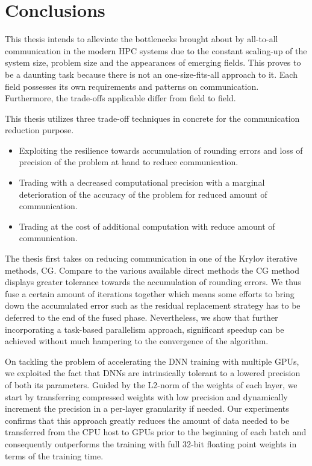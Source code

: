 \chapter{Conclusions}
\label{chap:conclusions}
This thesis intends to alleviate the bottlenecks brought about by all-to-all 
communication in the modern HPC systems due to the constant scaling-up of the 
system size, problem size and the appearances of emerging fields.
This proves to be a daunting task because there is not an one-size-fits-all 
approach to it. Each field possesses its own requirements and patterns on 
communication. Furthermore, the trade-offs applicable differ from field to 
field.

This thesis utilizes three trade-off techniques in concrete for the communication 
reduction purpose.
\begin{itemize}
    \item Exploiting the resilience towards accumulation of rounding errors and 
        loss of precision of the problem at hand to reduce communication.
    \item Trading with a decreased computational precision with a marginal 
        deterioration of the accuracy of the problem for reduced amount of 
        communication. 
    \item Trading at the cost of additional computation with reduce amount of 
        communication.
\end{itemize}

The thesis first takes on reducing communication in one of the Krylov iterative 
methods, CG. Compare to the various available direct methods the CG method 
displays greater tolerance towards the accumulation of rounding errors. We thus 
fuse a certain amount of iterations together which means some efforts to bring 
down the accumulated error such as the residual replacement strategy has to be 
deferred to the end of the fused phase. Nevertheless, we show that further 
incorporating a task-based parallelism approach, significant speedup can be 
achieved without much hampering to the convergence of the algorithm.

On tackling the problem of accelerating the DNN training with multiple GPUs, we 
exploited the fact that DNNs are intrinsically tolerant to a lowered precision 
of both its parameters. Guided by the L2-norm of the weights of each layer, we 
start by transferring compressed weights with low precision and dynamically 
increment the precision in a per-layer granularity if needed.
Our experiments confirms that this approach greatly reduces the amount of data
needed to be transferred from the CPU host to GPUs prior to the beginning of 
each batch and consequently outperforms the training with full 32-bit floating 
point weights in terms of the training time.

